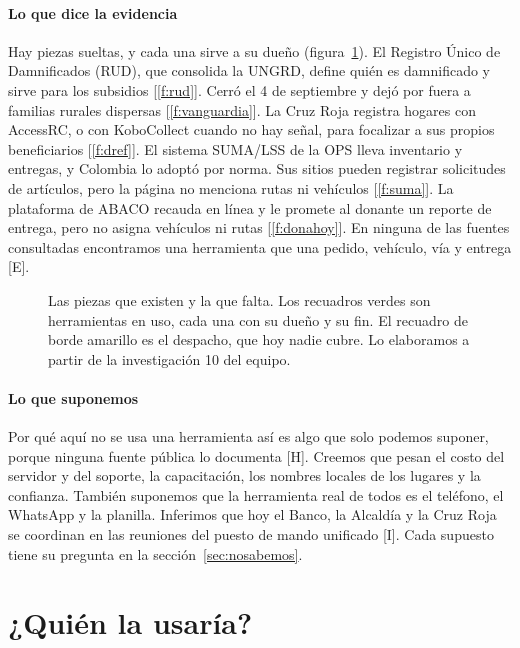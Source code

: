 \documentclass[11pt,letterpaper,parskip=half-]{scrartcl}
\newcommand{\marca}[1]{\textcolor{ceniza}{\footnotesize[#1]}}   %
\newcommand{\cf}[1]{\textcolor{tinta}{[\ref{#1}]}}                %
\begin{document}
\paragraph{Lo que dice la evidencia} Hay piezas sueltas, y cada una sirve a su dueño (figura~\ref{fig:piezas}). El Registro Único de Damnificados (RUD), que consolida la UNGRD, define quién es damnificado y sirve para los subsidios \cf{f:rud}. Cerró el 4 de septiembre y dejó por fuera a familias rurales dispersas \cf{f:vanguardia}. La Cruz Roja registra hogares con AccessRC, o con KoboCollect cuando no hay señal, para focalizar a sus propios beneficiarios \cf{f:dref}. El sistema SUMA/LSS de la OPS lleva inventario y entregas, y Colombia lo adoptó por norma. Sus sitios pueden registrar solicitudes de artículos, pero la página no menciona rutas ni vehículos \cf{f:suma}. La plataforma de ABACO recauda en línea y le promete al donante un reporte de entrega, pero no asigna vehículos ni rutas \cf{f:donahoy}. En ninguna de las fuentes consultadas encontramos una herramienta que una pedido, vehículo, vía y entrega \marca{E}.

\begin{figure}[ht]
\centering

\caption{Las piezas que existen y la que falta. Los recuadros verdes son herramientas en uso, cada una con su dueño y su fin. El recuadro de borde amarillo es el despacho, que hoy nadie cubre. Lo elaboramos a partir de la investigación 10 del equipo.}
\label{fig:piezas}
\end{figure}

\paragraph{Lo que suponemos} Por qué aquí no se usa una herramienta así es algo que solo podemos suponer, porque ninguna fuente pública lo documenta \marca{H}. Creemos que pesan el costo del servidor y del soporte, la capacitación, los nombres locales de los lugares y la confianza. También suponemos que la herramienta real de todos es el teléfono, el WhatsApp y la planilla. Inferimos que hoy el Banco, la Alcaldía y la Cruz Roja se coordinan en las reuniones del puesto de mando unificado \marca{I}. Cada supuesto tiene su pregunta en la sección~\ref{sec:nosabemos}.

\section{¿Quién la usaría?}
\end{document}
